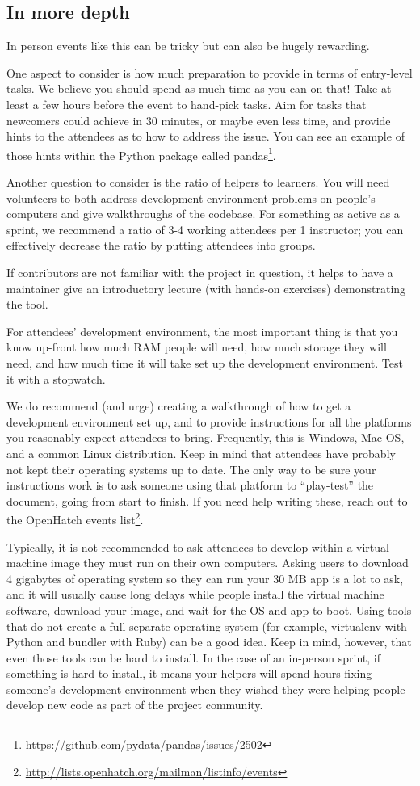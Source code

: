 \subsection{In more depth}
In person events like this can be tricky but can also be hugely rewarding.

One aspect to consider is how much preparation to provide in terms of entry-level tasks. We believe you should spend as much time as you can on that! Take at least a few hours before the event to hand-pick tasks. Aim for tasks that newcomers could achieve in 30 minutes, or maybe even less time, and provide hints to the attendees as to how to address the issue. You can see an example of those hints within the Python package called pandas\footnote{\url{https://github.com/pydata/pandas/issues/2502}}.

Another question to consider is the ratio of helpers to learners. You will need volunteers to both address development environment problems on people’s computers and give walkthroughs of the codebase. For something as active as a sprint, we recommend a ratio of 3-4 working attendees per 1 instructor; you can effectively decrease the ratio by putting attendees into groups.

If contributors are not familiar with the project in question, it helps to have a maintainer give an introductory lecture (with hands-on exercises) demonstrating the tool.

For attendees’ development environment, the most important thing is that you know up-front how much RAM people will need, how much storage they will need, and how much time it will take set up the development environment. Test it with a stopwatch.

We do recommend (and urge) creating a walkthrough of how to get a development environment set up, and to provide instructions for all the platforms you reasonably expect attendees to bring. Frequently, this is Windows, Mac OS, and a common Linux distribution. Keep in mind that attendees have probably not kept their operating systems up to date. The only way to be sure your instructions work is to ask someone using that platform to “play-test” the document, going from start to finish. If you need help writing these, reach out to the OpenHatch events list\footnote{\url{http://lists.openhatch.org/mailman/listinfo/events}}.

Typically, it is not recommended to ask attendees to develop within a virtual machine image they must run on their own computers. Asking users to download 4 gigabytes of operating system so they can run your 30 MB app is a lot to ask, and it will usually cause long delays while people install the virtual machine software, download your image, and wait for the OS and app to boot. Using tools that do not create a full separate operating system (for example, virtualenv with Python and bundler with Ruby) can be a good idea. Keep in mind, however, that even those tools can be hard to install. In the case of an in-person sprint, if something is hard to install, it means your helpers will spend hours fixing someone’s development environment when they wished they were helping people develop new code as part of the project community.

